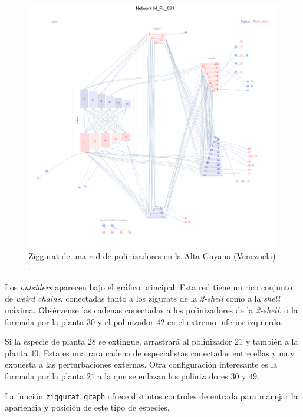 \clearpage
\begin{figure}[hp!]
\centering
\includegraphics[scale=0.55]{ManFigs/M_PL_031_ziggurat.png}
\caption {Ziggurat de una red de polinizadores en la Alta Guyana (Venezuela) \cite{ramirez1989biologia}.}
\label{fig:AKMAN_ziggurat_031}
\end{figure}

Los \textit{outsiders} aparecen bajo el gráfico principal. Esta red tiene un rico conjunto de \textit{weird chains}, conectadas tanto a los zigurats de la \textit{2-shell} como a la \textit{shell} máxima. Obsérvense las cadenas conectadas a los polinizadores de la \textit{2-shell}, o la formada por la planta $30$ y el polinizador $42$ en el extremo inferior izquierdo.

Si la especie de planta $28$ se extingue, arrastrará al polinizador $21$ y también a la planta $40$. Esta es una rara cadena de especialistas conectadas entre ellas y muy expuesta a las perturbaciones externas. Otra configuración interesante es la formada por la planta $21$ a la que se enlazan los polinizadores $30$ y $49$.

La función \texttt{ziggurat\_graph} ofrece distintos controles de entrada para manejar la apariencia y posición de este tipo de especies.

